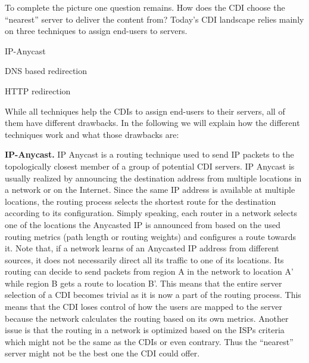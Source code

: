 To complete the picture one question remains. How does the CDI choose the
``nearest'' server to deliver the content from? Today's CDI landscape relies
mainly on three techniques to assign end-users to servers.

\begin{enumerate*}

  \item IP-Anycast

  \item DNS based redirection

  \item HTTP redirection

\end{enumerate*}

While all techniques help the CDIs to assign end-users to their servers, all of
them have different drawbacks. In the following we will explain how the
different techniques work and what those drawbacks are:

\vspace{1em} \noindent \textbf{IP-Anycast.} IP Anycast is a routing technique
used to send IP packets to the topologically closest member of a group of
potential CDI servers. IP Anycast is usually realized by announcing the
destination address from multiple locations in a network or on the Internet.
Since the same IP address is available at multiple locations, the routing
process selects the shortest route for the destination according to its
configuration. Simply speaking, each router in a network selects one of the
locations the Anycasted IP is announced from based on the used routing metrics
(\eg path length or routing weights) and configures a route towards it. Note
that, if a network learns of an Anycasted IP address from different sources, it
does not necessarily direct all its traffic to one of its locations. Its
routing can decide to send packets from region A in the network to location A'
while region B gets a route to location B'. This means that the entire server
selection of a CDI becomes trivial as it is now a part of the routing process.
This means that the CDI loses control of how the users are mapped to the server
because the network calculates the routing based on its own metrics. Another
issue is that the routing in a network is optimized based on the ISPs criteria
which might not be the same as the CDIs or even contrary. Thus the ``nearest''
server might not be the best one the CDI could offer.

